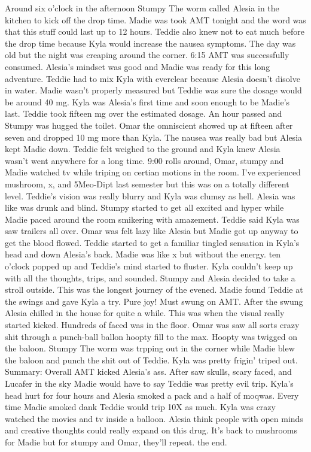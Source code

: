 \documentclass[12pt]{book}
\begin{document}
Around six o'clock in the afternoon Stumpy The worm called Alesia in the kitchen to kick off the drop time. Madie was took AMT tonight and the word was that this stuff could last up to 12 hours. Teddie also knew not to eat much before the drop time because Kyla would increase the nausea symptoms. The day was old but the night was creaping around the corner. 6:15 AMT was successfully consumed. Alesia's mindset was good and Madie was ready for this long adventure. Teddie had to mix Kyla with everclear because Alesia doesn't disolve in water. Madie wasn't properly measured but Teddie was sure the dosage would be around 40 mg. Kyla was Alesia's first time and soon enough to be Madie's last. Teddie took fifteen mg over the estimated dosage. An hour passed and Stumpy was hugged the toilet. Omar the omniscient showed up at fifteen after seven and dropped 10 mg more than Kyla. The nausea was really bad but Alesia kept Madie down. Teddie felt weighed to the ground and Kyla knew Alesia wasn't went anywhere for a long time. 9:00 rolls around, Omar, stumpy and Madie watched tv while triping on certian motions in the room. I've experienced mushroom, x, and 5Meo-Dipt last semester but this was on a totally different level. Teddie's vision was really blurry and Kyla was clumsy as hell. Alesia was like was drunk and blind. Stumpy started to get all excited and hyper while Madie paced around the room smikering with amazement. Teddie said Kyla was saw trailers all over. Omar was felt lazy like Alesia but Madie got up anyway to get the blood flowed. Teddie started to get a familiar tingled sensation in Kyla's head and down Alesia's back. Madie was like x but without the energy. ten o'clock popped up and Teddie's mind started to fluster. Kyla couldn't keep up with all the thoughts, trips, and sounded. Stumpy and Alesia decided to take a stroll outside. This was the longest journey of the evened. Madie found Teddie at the swings and gave Kyla a try. Pure joy! Must swung on AMT. After the swung Alesia chilled in the house for quite a while. This was when the visual really started kicked. Hundreds of faced was in the floor. Omar was saw all sorts crazy shit through a punch-ball ballon hoopty fill to the max. Hoopty was twigged on the baloon. Stumpy The worm was trpping out in the corner while Madie blew the baloon and punch the shit out of Teddie. Kyla was pretty frigin' triped out. Summary: Overall AMT kicked Alesia's ass. After saw skulls, scary faced, and Lucafer in the sky Madie would have to say Teddie was pretty evil trip. Kyla's head hurt for four hours and Alesia smoked a pack and a half of moqwas. Every time Madie smoked dank Teddie would trip 10X as much. Kyla was crazy watched the movies and tv inside a balloon. Alesia think people with open minds and creative thoughts could really expand on this drug. It's back to mushrooms for Madie but for stumpy and Omar, they'll repeat. the end.
\end{document}
